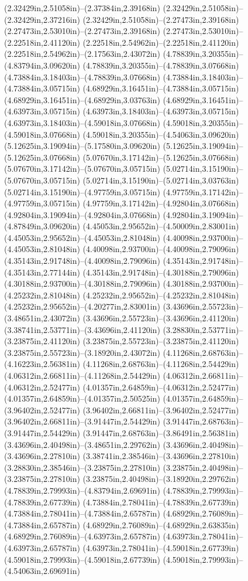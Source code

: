 (2.32429in,2.51058in)--(2.37384in,2.39168in) (2.32429in,2.51058in)--(2.32429in,2.37216in) (2.32429in,2.51058in)--(2.27473in,2.39168in) (2.27473in,2.53010in)--(2.27473in,2.39168in) (2.27473in,2.53010in)--(2.22518in,2.41120in) (2.22518in,2.54962in)--(2.22518in,2.41120in) (2.22518in,2.54962in)--(2.17563in,2.43072in) (4.78839in,3.20355in)--(4.83794in,3.09620in) (4.78839in,3.20355in)--(4.78839in,3.07668in) (4.73884in,3.18403in)--(4.78839in,3.07668in) (4.73884in,3.18403in)--(4.73884in,3.05715in) (4.68929in,3.16451in)--(4.73884in,3.05715in) (4.68929in,3.16451in)--(4.68929in,3.03763in) (4.68929in,3.16451in)--(4.63973in,3.05715in) (4.63973in,3.18403in)--(4.63973in,3.05715in) (4.63973in,3.18403in)--(4.59018in,3.07668in) (4.59018in,3.20355in)--(4.59018in,3.07668in) (4.59018in,3.20355in)--(4.54063in,3.09620in) (5.12625in,3.19094in)--(5.17580in,3.09620in) (5.12625in,3.19094in)--(5.12625in,3.07668in) (5.07670in,3.17142in)--(5.12625in,3.07668in) (5.07670in,3.17142in)--(5.07670in,3.05715in) (5.02714in,3.15190in)--(5.07670in,3.05715in) (5.02714in,3.15190in)--(5.02714in,3.03763in) (5.02714in,3.15190in)--(4.97759in,3.05715in) (4.97759in,3.17142in)--(4.97759in,3.05715in) (4.97759in,3.17142in)--(4.92804in,3.07668in) (4.92804in,3.19094in)--(4.92804in,3.07668in) (4.92804in,3.19094in)--(4.87849in,3.09620in) (4.45053in,2.95652in)--(4.50009in,2.83001in) (4.45053in,2.95652in)--(4.45053in,2.81048in) (4.40098in,2.93700in)--(4.45053in,2.81048in) (4.40098in,2.93700in)--(4.40098in,2.79096in) (4.35143in,2.91748in)--(4.40098in,2.79096in) (4.35143in,2.91748in)--(4.35143in,2.77144in) (4.35143in,2.91748in)--(4.30188in,2.79096in) (4.30188in,2.93700in)--(4.30188in,2.79096in) (4.30188in,2.93700in)--(4.25232in,2.81048in) (4.25232in,2.95652in)--(4.25232in,2.81048in) (4.25232in,2.95652in)--(4.20277in,2.83001in) (3.43696in,2.55723in)--(3.48651in,2.43072in) (3.43696in,2.55723in)--(3.43696in,2.41120in) (3.38741in,2.53771in)--(3.43696in,2.41120in) (3.28830in,2.53771in)--(3.23875in,2.41120in) (3.23875in,2.55723in)--(3.23875in,2.41120in) (3.23875in,2.55723in)--(3.18920in,2.43072in) (4.11268in,2.68763in)--(4.16223in,2.56381in) (4.11268in,2.68763in)--(4.11268in,2.54429in) (4.06312in,2.66811in)--(4.11268in,2.54429in) (4.06312in,2.66811in)--(4.06312in,2.52477in) (4.01357in,2.64859in)--(4.06312in,2.52477in) (4.01357in,2.64859in)--(4.01357in,2.50525in) (4.01357in,2.64859in)--(3.96402in,2.52477in) (3.96402in,2.66811in)--(3.96402in,2.52477in) (3.96402in,2.66811in)--(3.91447in,2.54429in) (3.91447in,2.68763in)--(3.91447in,2.54429in) (3.91447in,2.68763in)--(3.86491in,2.56381in) (3.43696in,2.40498in)--(3.48651in,2.29762in) (3.43696in,2.40498in)--(3.43696in,2.27810in) (3.38741in,2.38546in)--(3.43696in,2.27810in) (3.28830in,2.38546in)--(3.23875in,2.27810in) (3.23875in,2.40498in)--(3.23875in,2.27810in) (3.23875in,2.40498in)--(3.18920in,2.29762in) (4.78839in,2.79993in)--(4.83794in,2.69691in) (4.78839in,2.79993in)--(4.78839in,2.67739in) (4.73884in,2.78041in)--(4.78839in,2.67739in) (4.73884in,2.78041in)--(4.73884in,2.65787in) (4.68929in,2.76089in)--(4.73884in,2.65787in) (4.68929in,2.76089in)--(4.68929in,2.63835in) (4.68929in,2.76089in)--(4.63973in,2.65787in) (4.63973in,2.78041in)--(4.63973in,2.65787in) (4.63973in,2.78041in)--(4.59018in,2.67739in) (4.59018in,2.79993in)--(4.59018in,2.67739in) (4.59018in,2.79993in)--(4.54063in,2.69691in) 